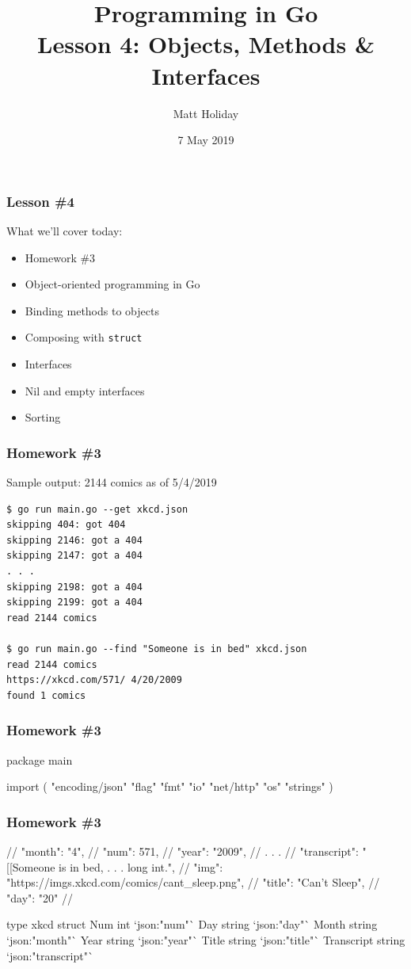 \documentclass[handout,compress,t,11pt]{beamer}
\title[Programming in Go]{\bf Programming in Go\\ Lesson 4: Objects, Methods \& Interfaces}
\author{Matt Holiday}
\institute[CP]{Cardinal Peak}
\date{7 May 2019}
\begin{document}
\frame{\titlepage} 

\begin{frame}[fragile]
    \frametitle{Lesson \#4}
    What we'll cover today:
    \begin{itemize}
    \item Homework \#3
    \item Object-oriented programming in Go
    \item Binding methods to objects
    \item Composing with \verb|struct|
    \item Interfaces
    \item Nil and empty interfaces
    \item Sorting
    \end{itemize}
\end{frame}



\begin{frame}[fragile]
    \frametitle{Homework \#3}
    Sample output: 2144 comics as of 5/4/2019 \par
{\small
\begin{verbatim}
$ go run main.go --get xkcd.json
skipping 404: got 404
skipping 2146: got a 404
skipping 2147: got a 404
. . .
skipping 2198: got a 404
skipping 2199: got a 404
read 2144 comics

$ go run main.go --find "Someone is in bed" xkcd.json
read 2144 comics
https://xkcd.com/571/ 4/20/2009
found 1 comics
\end{verbatim}}
\end{frame}

\begin{frame}[fragile]
    \frametitle{Homework \#3}
\begin{golang}
package main

import (
	"encoding/json"
	"flag"
	"fmt"
	"io"
	"net/http"
	"os"
	"strings"
)
\end{golang}
\end{frame}

\begin{frame}[fragile]
    \frametitle{Homework \#3}
\begin{golang}
// { "month":      "4",
//   "num":        571,
//   "year":       "2009",
//   . . .
//   "transcript": "[[Someone is in bed, . . . long int.",
//   "img":        "https://imgs.xkcd.com/comics/cant_sleep.png",
//   "title":      "Can't Sleep",
//   "day":        "20"
// }

type xkcd struct {
	Num        int    `json:"num"`
    Day        string `json:"day"`
    Month      string `json:"month"`
	Year       string `json:"year"`
	Title      string `json:"title"`
	Transcript string `json:"transcript"`
}
\end{golang}
\end{frame}
\end{document}
